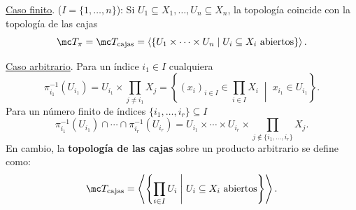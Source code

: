 \noindent \underline{Caso finito}. ($I = \{1, \ldots, n\}$):
Si $U_1 \subseteq X_1, \ldots, U_n \subseteq X_n$, la topología coincide con la topología de las cajas
\[
    \mc T_\pi = \mc T_{\text{cajas}} = \left\langle \{U_1 \times \cdots \times U_n \mid U_i \subseteq X_i \text{ abiertos}\} \right\rangle.
\]

\noindent \underline{Caso arbitrario}. Para un índice $i_1 \in I$ cualquiera
\[
    \pi_{i_1}^{-1}(U_{i_1}) = U_{i_1} \times \prod_{j \neq i_1} X_j = \left\{ (x_i)_{i \in I} \in \prod_{i \in I} X_i \;\middle|\; x_{i_1} \in U_{i_1} \right\}.
\]
Para un número finito de índices $\{i_1, \ldots, i_r\} \subseteq I$
\[
    \pi_{i_1}^{-1}(U_{i_1}) \cap \cdots \cap \pi_{i_r}^{-1}(U_{i_r}) = U_{i_1} \times \cdots \times U_{i_r} \times \prod_{j \notin \{i_1, \ldots, i_r\}} X_j.
\]
En cambio, la \textbf{topología de las cajas} sobre un producto arbitrario se define como:
\[
    \mc T_{\text{cajas}} = \left\langle \left\{ \prod_{i \in I} U_i \;\middle|\; U_i \subseteq X_i \text{ abiertos} \right\} \right\rangle.
\]

